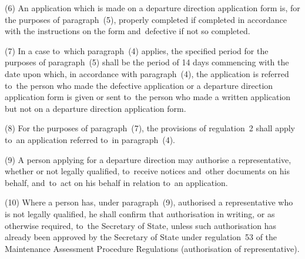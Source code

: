 \documentclass[12pt,a4paper]{article}
\begin{document}
(6) An application which is made on a departure direction application form is,
for the purposes of paragraph~(5), properly completed if completed in accordance
with the instructions on the form and~defective if not so completed.

(7) In a case to~which paragraph~(4) applies, the specified period for the
purposes of paragraph~(5) shall be the period of 14 days commencing with the
date upon which, in accordance with paragraph~(4), the application is referred
to~the person who made the defective application or a departure direction
application form is given or sent to~the person who made a written application
but not on a departure direction application form.

(8) For the purposes of paragraph~(7), the provisions of regulation~2 shall
apply to~an application referred to~in paragraph~(4).

(9) A person applying for a departure direction may authorise a representative,
whether or not legally qualified, to~receive notices and~other documents on his
behalf, and~to~act on his behalf in relation to~an application.

(10) Where a person has, under paragraph~(9), authorised a representative who is
not legally qualified, he shall confirm that authorisation in writing, or as
otherwise required, to~the Secretary of State, unless such authorisation has
already been approved by the Secretary of State under regulation~53 of the
Maintenance Assessment Procedure Regulations (authorisation of representative).
\end{document}
